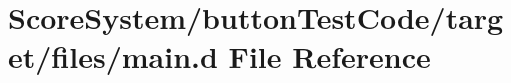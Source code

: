 \hypertarget{button_test_code_2target_2files_2main_8d}{}\section{Score\+System/button\+Test\+Code/target/files/main.d File Reference}
\label{button_test_code_2target_2files_2main_8d}
